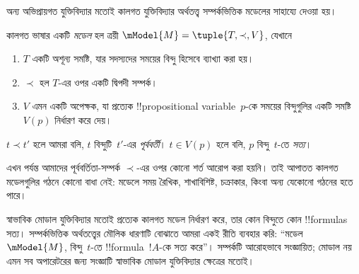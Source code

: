 \documentclass[../../../include/open-logic-section]{subfiles}
\begin{document}
অন্য অভিপ্রায়গত যুক্তিবিদ্যার মতোই কালগত যুক্তিবিদ্যার অর্থতত্ত্ব সম্পর্কভিত্তিক মডেলের সাহায্যে দেওয়া হয়।

\begin{defn}
  কালগত ভাষার একটি \emph{মডেল} হল ত্রয়ী
  $\mModel{M} = \tuple{T, \prec, V}$, যেখানে
  \begin{enumerate}
  \item $T$ একটি অশূন্য সমষ্টি, যার সদস্যদের সময়ের বিন্দু হিসেবে ব্যাখ্যা করা হয়।
  \item $\prec$ হল $T$-এর ওপর একটি দ্বিপদী সম্পর্ক।
  \item $V$ এমন একটি অপেক্ষক, যা প্রত্যেক !!{propositional
    variable}~$p$-কে সময়ের বিন্দুগুলির একটি সমষ্টি $V(p)$ নির্ধারণ করে দেয়।
  \end{enumerate}
  $t \prec t'$ হলে আমরা বলি, $t$ বিন্দুটি~$t'$-এর \emph{পূর্ববর্তী}।
  $t \in V(p)$ হলে বলি, $p$ বিন্দু~$t$-তে \emph{সত্য}।
\end{defn}

এখন পর্যন্ত আমাদের পূর্ববর্তিতা-সম্পর্ক $\prec$-এর ওপর কোনো শর্ত আরোপ করা হয়নি। তাই আপাতত কালগত মডেলগুলির গঠনে কোনো বাধা নেই: মডেলে সময় রৈখিক, শাখাবিশিষ্ট, চক্রাকার, কিংবা অন্য যেকোনো গঠনের হতে পারে।

স্বাভাবিক মোডাল যুক্তিবিদ্যার মতোই প্রত্যেক কালগত মডেল নির্ধারণ করে, তার কোন বিন্দুতে কোন !!{formula}s সত্য। সম্পর্কভিত্তিক অর্থতত্ত্বের মৌলিক ধারণাটি বোঝাতে আমরা একই রীতি ব্যবহার করি: ``মডেল $\mModel{M}$, বিন্দু~$t$-তে !!{formula}~$!A$-কে সত্য করে''। সম্পর্কটি আরোহভাবে সংজ্ঞায়িত; মোডাল নয় এমন সব অপারেটরের জন্য সংজ্ঞাটি স্বাভাবিক মোডাল যুক্তিবিদ্যার ক্ষেত্রের মতোই।
\end{document}

